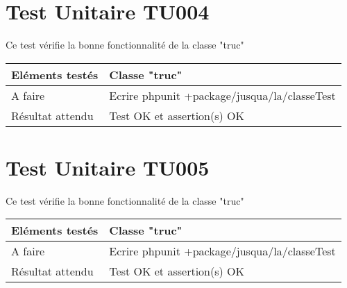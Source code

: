   	
  		
\section{Test Unitaire TU004}

Ce test vérifie la bonne fonctionnalité de la classe "truc"
  		\begin{center}
    	 		\begin{tabular}[h]{|p{}|p{}|}
			\hline
				Eléments testés & Classe "truc" \\\hline
    				A faire & Ecrire phpunit +package/jusqua/la/classeTest \\\hline
    				Résultat attendu & Test OK et assertion(s) OK \\\hline
     		\end{tabular}
  		\end{center}	



\section{Test Unitaire TU005}

Ce test vérifie la bonne fonctionnalité de la classe "truc"
  		\begin{center}
    	 		\begin{tabular}[h]{|p{}|p{}|}
			\hline
				Eléments testés & Classe "truc" \\\hline
    				A faire & Ecrire phpunit +package/jusqua/la/classeTest \\\hline
    				Résultat attendu & Test OK et assertion(s) OK \\\hline
     		\end{tabular}
  		\end{center}	